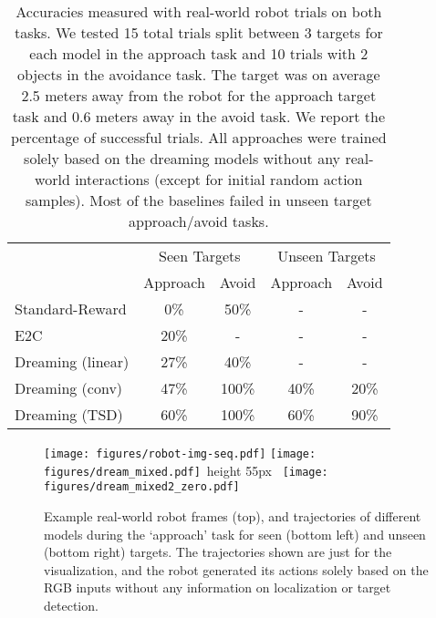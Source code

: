 \documentclass[letterpaper, 10 pt, conference]{ieeeconf}
\newcommand{\aj}[1]{\fxnote{\hl{AJ: #1}}}
\newcommand{\mryoo}[1]{\fxnote{\hl{Michael: #1}}}
\newcommand{\rulesep}{\unskip\ \vrule width 0.75pt height 55px\ }
\begin{document}
\begin{table}
\small
  \caption{Accuracies measured with real-world robot trials on both tasks. We tested 15 total trials split between 3 targets for each model in the approach task and 10 trials with 2 objects in the avoidance task. The target was on average 2.5 meters away from the robot for the approach target task and 0.6 meters away in the avoid task. We report the percentage of successful trials. All approaches were trained solely based on the dreaming models without any real-world interactions (except for initial random action samples). Most of the baselines failed in unseen target approach/avoid tasks.}
  \label{tab:real}
  \centering
  \begin{tabular}{lcccc}
    \toprule
       & \multicolumn{2}{c}{Seen Targets} &    \multicolumn{2}{c}{Unseen Targets}\\
       \cmidrule(r){2-3}  \cmidrule(r){4-5}
         &  Approach    & Avoid  & Approach & Avoid\\
    \midrule
     Standard-Reward & 0\% & 50\%  & - & -\\
     E2C \cite{watter2015embed} & 20\% & - & - & -\\
     Dreaming (linear) & 27\% & 40\% & - & - \\
     Dreaming (conv) & 47\% & 100\% & 40\% & 20\%\\
     Dreaming (TSD) & 60\% & 100\% & 60\% & 90\%\\
    \bottomrule
  \end{tabular}
\end{table}



\begin{figure*}
    \centering
    \texttt{[image: figures/robot-img-seq.pdf]}
      \texttt{[image: figures/dream\_mixed.pdf]}\rulesep
      \texttt{[image: figures/dream\_mixed2\_zero.pdf]}
      \caption{Example real-world robot frames (top), and trajectories of different models during the `approach' task for seen (bottom left) and unseen (bottom right) targets. The trajectories shown are just for the visualization, and the robot generated its actions solely based on the RGB inputs without any information on localization or target detection.} %
      \label{fig:real-traj}
\end{figure*}
\end{document}
